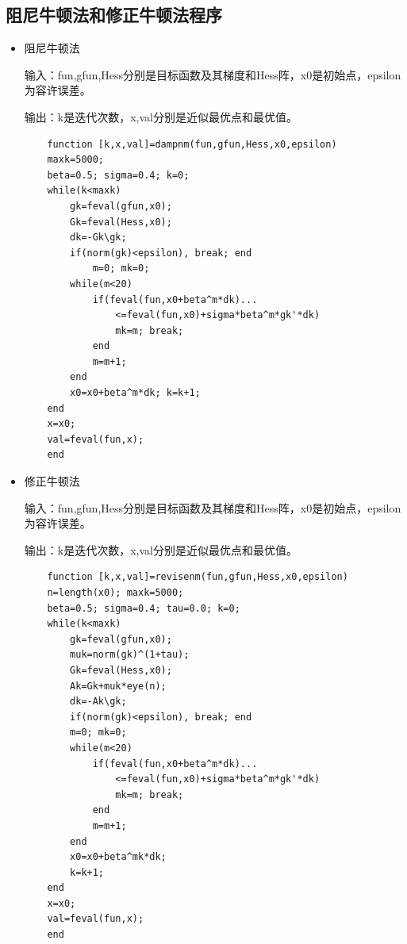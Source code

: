 \documentclass[12pt]{article} %
\begin{document}
	\subsection{阻尼牛顿法和修正牛顿法程序}
	\begin{itemize}
		\item 阻尼牛顿法
		
		输入：fun,gfun,Hess分别是目标函数及其梯度和Hess阵，x0是初始点，epsilon为容许误差。
		
		输出：k是迭代次数，x,val分别是近似最优点和最优值。
	\begin{lstlisting}
	function [k,x,val]=dampnm(fun,gfun,Hess,x0,epsilon)
	maxk=5000; 
	beta=0.5; sigma=0.4; k=0;
	while(k<maxk)
		gk=feval(gfun,x0); 
		Gk=feval(Hess,x0); 
		dk=-Gk\gk; 
		if(norm(gk)<epsilon), break; end 
			m=0; mk=0;
		while(m<20) 
			if(feval(fun,x0+beta^m*dk)...
				<=feval(fun,x0)+sigma*beta^m*gk'*dk)
				mk=m; break;
			end
			m=m+1;
		end
		x0=x0+beta^m*dk; k=k+1;
	end
	x=x0;
	val=feval(fun,x);
	end
	\end{lstlisting}
		\item 修正牛顿法
		
		输入：fun,gfun,Hess分别是目标函数及其梯度和Hess阵，x0是初始点，epsilon为容许误差。
		
		输出：k是迭代次数，x,val分别是近似最优点和最优值。
		\begin{lstlisting}
	function [k,x,val]=revisenm(fun,gfun,Hess,x0,epsilon)
	n=length(x0); maxk=5000; 
	beta=0.5; sigma=0.4; tau=0.0; k=0; 
	while(k<maxk)
		gk=feval(gfun,x0);
		muk=norm(gk)^(1+tau);
		Gk=feval(Hess,x0);
		Ak=Gk+muk*eye(n);
		dk=-Ak\gk;
		if(norm(gk)<epsilon), break; end 
		m=0; mk=0; 
		while(m<20)
			if(feval(fun,x0+beta^m*dk)...
				<=feval(fun,x0)+sigma*beta^m*gk'*dk) 
				mk=m; break;
			end
			m=m+1;
		end
		x0=x0+beta^mk*dk;
		k=k+1;
	end
	x=x0;
	val=feval(fun,x);
	end
		\end{lstlisting}	
	\end{itemize}
\end{document}
